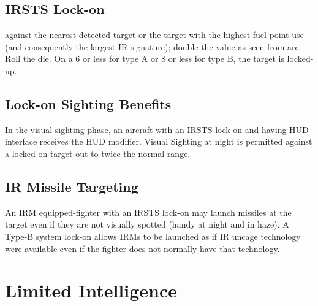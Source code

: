 \begin{advancedrules}
    \subsection{IRSTS Lock-on}  against the nearest detected target or the target with the highest fuel point use (and consequently the largest IR signature); double the value as seen from  arc.  Roll the die. On a 6 or less for type A or 8 or less for type B, the target is locked-up. 


    \subsection{Lock-on Sighting Benefits} In the visual sighting phase, an aircraft with an IRSTS lock-on and having HUD interface receives the HUD modifier. Visual Sighting at night is permitted against a locked-on target out to twice the normal range.

    \subsection{IR Missile Targeting} An IRM equipped-fighter with an IRSTS lock-on may launch missiles at the target even if they are not visually spotted (handy at night and in haze).  A Type-B system lock-on allows IRMs to be launched as if IR uncage technology were available even if the fighter does not normally have that technology.

    \section{Limited Intelligence}
    \label{rule:limited-intelligence}


\end{advancedrules}
